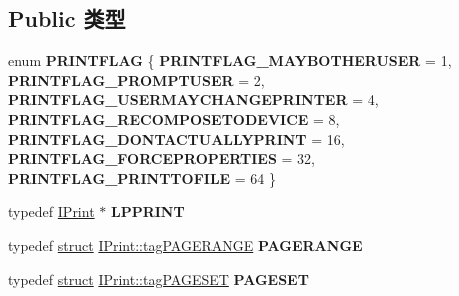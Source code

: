 \subsection*{Public 类型}
\begin{DoxyCompactItemize}
\item 
\mbox{\label{interface_i_print_a70bdbbfe61682e73b237bc3c7cbefb1a}} 
enum {\bfseries P\+R\+I\+N\+T\+F\+L\+AG} \{ \newline
{\bfseries P\+R\+I\+N\+T\+F\+L\+A\+G\+\_\+\+M\+A\+Y\+B\+O\+T\+H\+E\+R\+U\+S\+ER} = 1, 
{\bfseries P\+R\+I\+N\+T\+F\+L\+A\+G\+\_\+\+P\+R\+O\+M\+P\+T\+U\+S\+ER} = 2, 
{\bfseries P\+R\+I\+N\+T\+F\+L\+A\+G\+\_\+\+U\+S\+E\+R\+M\+A\+Y\+C\+H\+A\+N\+G\+E\+P\+R\+I\+N\+T\+ER} = 4, 
{\bfseries P\+R\+I\+N\+T\+F\+L\+A\+G\+\_\+\+R\+E\+C\+O\+M\+P\+O\+S\+E\+T\+O\+D\+E\+V\+I\+CE} = 8, 
\newline
{\bfseries P\+R\+I\+N\+T\+F\+L\+A\+G\+\_\+\+D\+O\+N\+T\+A\+C\+T\+U\+A\+L\+L\+Y\+P\+R\+I\+NT} = 16, 
{\bfseries P\+R\+I\+N\+T\+F\+L\+A\+G\+\_\+\+F\+O\+R\+C\+E\+P\+R\+O\+P\+E\+R\+T\+I\+ES} = 32, 
{\bfseries P\+R\+I\+N\+T\+F\+L\+A\+G\+\_\+\+P\+R\+I\+N\+T\+T\+O\+F\+I\+LE} = 64
 \}
\item 
\mbox{\label{interface_i_print_a7b92ecb0eb5432bac2582639466fc3ab}} 
typedef \hyperlink{interface_i_print}{I\+Print} $\ast$ {\bfseries L\+P\+P\+R\+I\+NT}
\item 
\mbox{\label{interface_i_print_a323ff605825aafb3fc954d4ed7ee59c8}} 
typedef \hyperlink{interfacestruct}{struct} \hyperlink{struct_i_print_1_1tag_p_a_g_e_r_a_n_g_e}{I\+Print\+::tag\+P\+A\+G\+E\+R\+A\+N\+GE} {\bfseries P\+A\+G\+E\+R\+A\+N\+GE}
\item 
\mbox{\label{interface_i_print_adafbbc336e5ea2a758eec1cc4adf8453}} 
typedef \hyperlink{interfacestruct}{struct} \hyperlink{struct_i_print_1_1tag_p_a_g_e_s_e_t}{I\+Print\+::tag\+P\+A\+G\+E\+S\+ET} {\bfseries P\+A\+G\+E\+S\+ET}
\end{DoxyCompactItemize}
